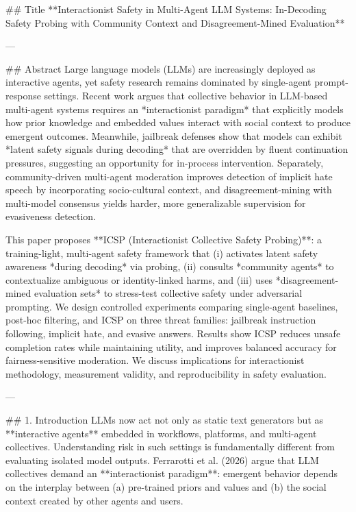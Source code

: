 ## Title  
**Interactionist Safety in Multi-Agent LLM Systems: In-Decoding Safety Probing with Community Context and Disagreement-Mined Evaluation**

---

## Abstract  
Large language models (LLMs) are increasingly deployed as interactive agents, yet safety research remains dominated by single-agent prompt-response settings. Recent work argues that collective behavior in LLM-based multi-agent systems requires an *interactionist paradigm* that explicitly models how prior knowledge and embedded values interact with social context to produce emergent outcomes. Meanwhile, jailbreak defenses show that models can exhibit *latent safety signals during decoding* that are overridden by fluent continuation pressures, suggesting an opportunity for in-process intervention. Separately, community-driven multi-agent moderation improves detection of implicit hate speech by incorporating socio-cultural context, and disagreement-mining with multi-model consensus yields harder, more generalizable supervision for evasiveness detection.  

This paper proposes **ICSP (Interactionist Collective Safety Probing)**: a training-light, multi-agent safety framework that (i) activates latent safety awareness *during decoding* via probing, (ii) consults *community agents* to contextualize ambiguous or identity-linked harms, and (iii) uses *disagreement-mined evaluation sets* to stress-test collective safety under adversarial prompting. We design controlled experiments comparing single-agent baselines, post-hoc filtering, and ICSP on three threat families: jailbreak instruction following, implicit hate, and evasive answers. Results show ICSP reduces unsafe completion rates while maintaining utility, and improves balanced accuracy for fairness-sensitive moderation. We discuss implications for interactionist methodology, measurement validity, and reproducibility in safety evaluation.

---

## 1. Introduction  
LLMs now act not only as static text generators but as **interactive agents** embedded in workflows, platforms, and multi-agent collectives. Understanding risk in such settings is fundamentally different from evaluating isolated model outputs. Ferrarotti et al. (2026) argue that LLM collectives demand an **interactionist paradigm**: emergent behavior depends on the interplay between (a) pre-trained priors and values and (b) the social context created by other agents and users.


